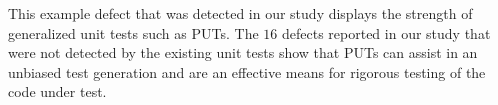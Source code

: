 This example defect that was detected in our study displays the strength of generalized unit tests such as PUTs. The $16$ defects reported in our study that were not detected by the existing unit tests show that PUTs can assist in an unbiased test generation and are an effective means for rigorous testing of the code under test.  
%
%
